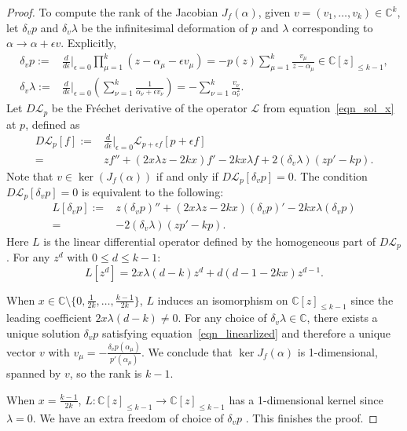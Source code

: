 \documentclass[11pt]{amsart}
\theoremstyle{remark}
\numberwithin{equation}{section}
\begin{document}
\begin{proof}
To compute the rank of the Jacobian $J_f(\alpha)$, given $v =(v_1,\dots,v_k) \in \mathbb{C}^k$, let $\delta_v p$ and $\delta_v \lambda$ be the infinitesimal deformation of $p$ and $\lambda$ corresponding to $\alpha \to \alpha + \epsilon v$. Explicitly,
\[
\begin{split}
    \delta_v p :=& \frac{d}{d\epsilon} \Big|_{\epsilon =0} \prod_{\mu=1}^k (z-\alpha_\mu - \epsilon v_\mu) = - p(z) \sum_{\mu=1}^k \frac{v_\mu}{z-\alpha_\mu} \in \mathbb{C}[z]_{\leq k-1},
    \\
    \delta_v \lambda :=& \frac{d}{d\epsilon} \Big|_{\epsilon=0} \left( \sum_{\nu=1}^k \frac{1}{\alpha_\nu + \epsilon v_\nu} \right) = - \sum_{\nu=1}^k \frac{v_\nu}{\alpha_\nu^2}.
\end{split}
\]
Let $D \mathcal{L}_p$ be the Fr\'echet derivative of the operator $\mathcal{L}$ from equation~\eqref{eqn_sol_x} at $p$, defined as
\[
\begin{split}
    D\mathcal{L}_p[f] :=&  \frac{d}{d\epsilon} \Big|_{\epsilon =0} \mathcal{L}_{p+ \epsilon f}[p + \epsilon f]
    \\
    =& z f'' + (2x\lambda z-2kx) f' -2kx \lambda f + 2 (\delta_v \lambda)(zp'-kp).
\end{split}
\]
Note that $v \in \ker (J_f(\alpha))$ if and only if $D\mathcal{L}_p[ \delta_v p ] =0$. The condition $D\mathcal{L}_p[ \delta_v p ] =0$ is equivalent to the following:
\begin{equation} \label{eqn_linearlized}
\begin{split}
     L[\delta_v p] :=& z (\delta_v p)'' + (2x \lambda z - 2kx)(\delta_v p)' - 2kx \lambda (\delta_v p) 
     \\
     =& -2(\delta_v \lambda)(z p' - k p).
\end{split}
\end{equation}
Here $L$ is the linear differential operator defined by the homogeneous part of $D\mathcal{L}_p$. For any $z^d$ with $0 \leq d \leq k-1$:
\[
L[z^d] = 2x\lambda(d-k) z^d + d(d - 1 - 2kx) z^{d-1}.
\]

When $x \in \mathbb{C} \setminus \{0, \frac{1}{2k}, \dots, \frac{k-1}{2k} \}$, $L$ induces an isomorphism on $\mathbb{C}[z]_{\leq k-1}$ since the leading coefficient $2x\lambda(d-k) \neq 0$. For any choice of $\delta_v \lambda \in \mathbb{C}$, there exists a unique solution $\delta_v p$ satisfying equation~\eqref{eqn_linearlized} and therefore a unique vector $v$ with $v_\mu = -\frac{\delta_v p(\alpha_\mu)}{p'(\alpha_\mu)}$. We conclude that $\ker J_f(\alpha)$ is 1-dimensional, spanned by $v$, so the rank is $k-1$. 

When $x = \frac{k-1}{2k}$, $L : \mathbb{C}[z]_{\leq k-1} \rightarrow \mathbb{C}[z]_{\leq k-1}$ has a 1-dimensional kernel since $\lambda=0$. We have an extra freedom of choice of $\delta_v p$ . This finishes the proof. 
\end{proof}
\end{document}
